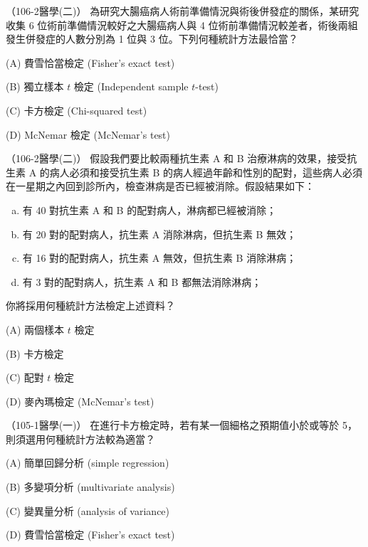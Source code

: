     \begin{docexam}{（106-2醫學(二)）}
        為研究大腸癌病人術前準備情況與術後併發症的關係，某研究收集 6 位術前準備情況較好之大腸癌病人與 4 位術前準備情況較差者，術後兩組發生併發症的人數分別為 1 位與 3 位。下列何種統計方法最恰當？

        (A) 費雪恰當檢定 (Fisher's exact test)
        
        (B) 獨立樣本 $t$ 檢定 (Independent sample $t$-test)

        (C) 卡方檢定 (Chi-squared test)
 
        (D) McNemar 檢定 (McNemar's test)
    \end{docexam}
    
    \begin{docexam}{（106-2醫學(二)）}
        假設我們要比較兩種抗生素 A 和 B 治療淋病的效果，接受抗生素 A 的病人必須和接受抗生素 B 的病人經過年齡和性別的配對，這些病人必須在一星期之內回到診所內，檢查淋病是否已經被消除。假設結果如下：

        \begin{enumerate}[(a)]
            \item 有 40 對抗生素 A 和 B 的配對病人，淋病都已經被消除；
            \item 有 20 對的配對病人，抗生素 A 消除淋病，但抗生素 B 無效；
            \item 有 16 對的配對病人，抗生素 A 無效，但抗生素 B 消除淋病；
            \item 有 3 對的配對病人，抗生素 A 和 B 都無法消除淋病；
        \end{enumerate}

        你將採用何種統計方法檢定上述資料？

        (A) 兩個樣本 $t$ 檢定
        
        (B) 卡方檢定

        (C) 配對 $t$ 檢定
 
        (D) 麥內瑪檢定 (McNemar's test)
    \end{docexam}
    
    \begin{docexam}{（105-1醫學(一)）}
        在進行卡方檢定時，若有某一個細格之預期值小於或等於 5，則須選用何種統計方法較為適當？

        (A) 簡單回歸分析 (simple regression)
        
        (B) 多變項分析 (multivariate analysis)

        (C) 變異量分析 (analysis of variance)
 
        (D) 費雪恰當檢定 (Fisher's exact test)
    \end{docexam}
    
